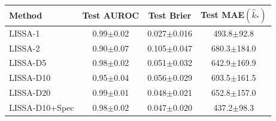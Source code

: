 \begin{tabular}{lccc}
\toprule
Method & Test AUROC & Test Brier & Test MAE$(\hat{k}_*)$ \\
\midrule
LISSA-1 & 0.99$\pm$0.02 & 0.027$\pm$0.016 & 493.8$\pm$92.8 \\
LISSA-2 & 0.90$\pm$0.07 & 0.105$\pm$0.047 & 680.3$\pm$184.0 \\
LISSA-D5 & 0.98$\pm$0.02 & 0.051$\pm$0.032 & 642.9$\pm$169.9 \\
LISSA-D10 & 0.95$\pm$0.04 & 0.056$\pm$0.029 & 693.5$\pm$161.5 \\
LISSA-D20 & 0.99$\pm$0.01 & 0.048$\pm$0.021 & 652.8$\pm$157.0 \\
LISSA-D10+Spec & 0.98$\pm$0.02 & 0.047$\pm$0.020 & 437.2$\pm$98.3 \\
\bottomrule
\end{tabular}
